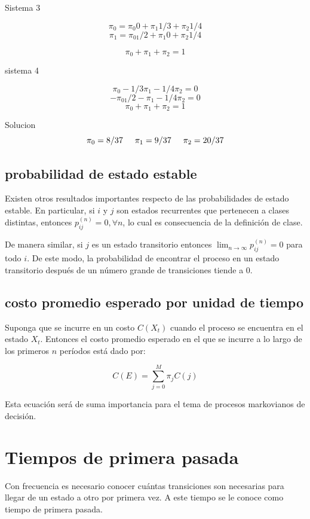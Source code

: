 \documentclass{article}
\begin{document}
Sistema 3

\[\pi_0 = \pi_0 0 + \pi_1 1/3 + \pi_2 1/4\]
\[\pi_1 = \pi_01/2 + \pi_1 0 + \pi_2 1/4\]

\[\pi_0 + \pi_1 + \pi_2 = 1\]

sistema 4

\[ \pi_0 - 1/3\pi_1 - 1/4\pi_2 = 0 \]
\[ -\pi_01/2 - \pi_1 - 1/4\pi_2 = 0 \]
\[\pi_0 + \pi_1 + \pi_2 = 1\]

Solucion
\[\pi_0 = 8/37 \hspace{.5cm} \pi_1 = 9/37 \hspace{.5cm} \pi_2 = 20/37\]

\subsection*{probabilidad de estado estable}

Existen otros resultados importantes respecto de las probabilidades de estado estable. En particular, si \( i \) y \( j \) son estados recurrentes que pertenecen a clases distintas, entonces \( p_{ij}^{(n)} = 0, \forall n \), lo cual es consecuencia de la definición de clase.

De manera similar, si \( j \) es un estado transitorio entonces \( \lim_{n \to \infty} p_{ij}^{(n)} = 0 \) para todo \( i \). De este modo, la probabilidad de encontrar el proceso en un estado transitorio después de un número grande de transiciones tiende a 0.


\subsection*{costo promedio esperado por unidad de tiempo}

Suponga que se incurre en un costo \( C(X_t) \) cuando el proceso se encuentra en el estado \( X_t \). Entonces el costo promedio esperado en el que se incurre a lo largo de los primeros \( n \) períodos está dado por:

\[ C(E) = \sum_{j=0}^{M} \pi_j C(j) \]

Esta ecuación será de suma importancia para el tema de procesos markovianos de decisión.

\section{Tiempos de primera pasada}

Con frecuencia es necesario conocer cuántas transiciones son necesarias para llegar de un estado a otro por primera vez. A este tiempo se le conoce como tiempo de primera pasada.
\end{document}

